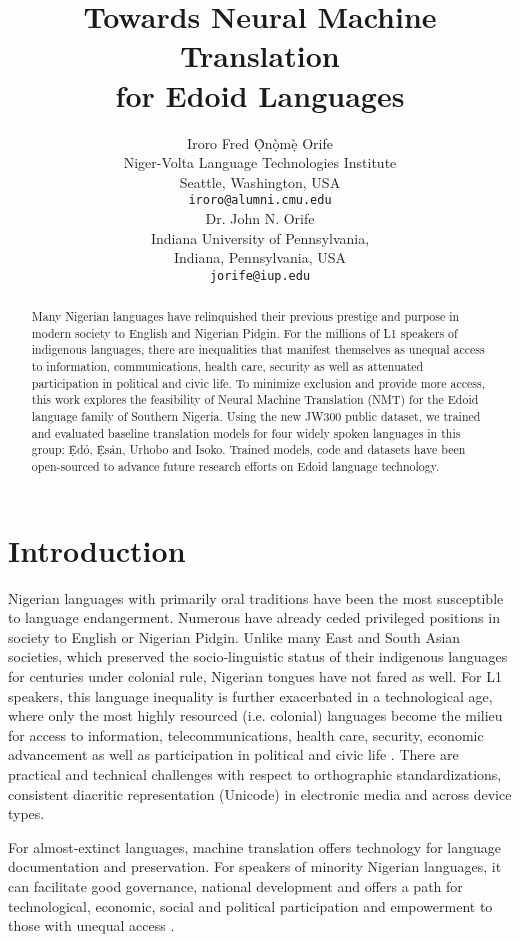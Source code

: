 \documentclass{article} %
\title{Towards Neural Machine Translation \\ for Edoid Languages}
\author{Iroro Fred \d{\`O}n\d{\`o}m\d{\`e} Orife \\
Niger-Volta Language Technologies Institute\\
Seattle, Washington, USA \\
\texttt{iroro@alumni.cmu.edu} \\
\And
Dr. John N. Orife\\
Indiana University of Pennsylvania, \\
Indiana, Pennsylvania, USA \\
\texttt{jorife@iup.edu} \\
}
\begin{document}
\maketitle

\begin{abstract}
Many Nigerian languages have relinquished their previous prestige and purpose in modern society to English and Nigerian Pidgin. For the millions of L1 speakers of indigenous languages, there are inequalities that manifest themselves as unequal access to information, communications, health care, security as well as attenuated participation in political and civic life. To minimize exclusion and provide more access, this work explores the feasibility of Neural Machine Translation (NMT) for the Edoid language family of Southern Nigeria. Using the new JW300 public dataset, we trained and evaluated baseline translation models for four widely spoken languages in this group: \d{\`E}d{\'o}, \d{\`E}s{\'a}n, Urhobo and Isoko. Trained models, code and datasets have been open-sourced to advance future research efforts on Edoid language technology.\\
\end{abstract}

\section{Introduction}

Nigerian languages with primarily oral traditions have been the most susceptible to language endangerment. Numerous have already ceded privileged positions in society to English or Nigerian Pidgin. Unlike many East and South Asian societies, which preserved the socio-linguistic status of their indigenous languages for centuries under colonial rule, Nigerian tongues have not fared as well.
For L1 speakers, this language inequality is further exacerbated in a technological age, where only the most highly resourced (i.e. colonial) languages become the milieu for access to information, telecommunications, health care, security, economic advancement as well as participation in political and civic life \cite{odojelanguage, awobuluyi201626}. There are practical and technical challenges with respect to orthographic standardizations, consistent diacritic representation (Unicode) in electronic media and across device types. 

For almost-extinct languages, machine translation offers technology for language documentation and preservation. For speakers of minority Nigerian languages, it can facilitate good governance, national development and offers a path for technological, economic, social and political participation and empowerment to those with unequal access \citep{odoje201612, odojelanguage}. %
\end{document}
